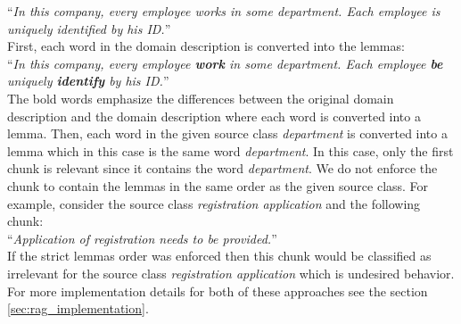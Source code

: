 \noindent{}``\textit{In this company, every employee works in some department. Each employee is uniquely identified by his ID.}'' \\

\noindent{}First, each word in the domain description is converted into the lemmas: \\

\noindent{}``\textit{In this company, every employee \textbf{work} in some department. Each employee \textbf{be} uniquely \textbf{identify} by his ID.}'' \\

\noindent{}The bold words emphasize the differences between the original domain description and the domain description where each word is converted into a lemma. Then, each word in the given source class \textit{department} is converted into a lemma which in this case is the same word \textit{department}.  In this case, only the first chunk is relevant since it contains the word \textit{department}. We do not enforce the chunk to contain the lemmas in the same order as the given source class. For example, consider the source class \textit{registration application} and the following chunk: \\

\noindent{}``\textit{Application of registration needs to be provided.}'' \\

\noindent{}If the strict lemmas order was enforced then this chunk would be classified as irrelevant for the source class \textit{registration application} which is undesired behavior. For more implementation details for both of these approaches see the section \ref{sec:rag_implementation}.
